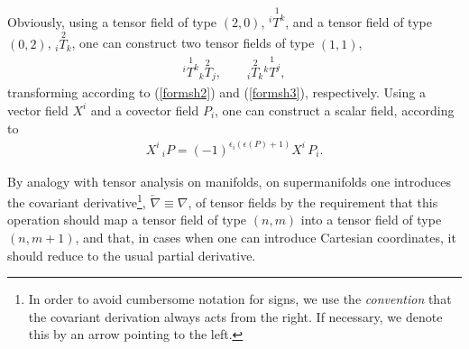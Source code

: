 \documentclass[a4paper,11pt]{article}
\begin{document}
Obviously, using a tensor field of type $(2,0)$,
${\stackrel{1}{^{i}T^{k}}}$, and a tensor field of type $(0,2)$,
${\stackrel{2}{_{i}T_{k}}}$, one can construct two tensor fields
of type $(1,1)$,
\begin{eqnarray} \label{contr}
{\overset{1}{^iT^k}}{\overset{2}{_kT_j}},\qquad
{\overset{2}{_iT_k}}{\overset{1}{^kT^j}},
\end{eqnarray}
transforming according to (\ref{formsh2}) and (\ref{formsh3}), respectively.
Using a vector field $X^{i}$ and a covector field $P_{i}$, one can construct
a scalar field, according to
\begin{eqnarray}
\label{sc} X^i\,_iP = (-1)^{\epsilon_i(\epsilon(P)+1)}X^i\,P_i.
\end{eqnarray}

By analogy with tensor analysis on manifolds, on supermanifolds one
introduces the covariant derivative\footnote{%
In order to avoid cumbersome notation for signs, we use the \emph{convention}
that the covariant derivation always acts from the right. If necessary, we
denote this by an arrow pointing to the left.}, $\overleftarrow{\nabla }%
\equiv \nabla $, of tensor fields by the requirement that this
operation
should map a tensor field of type $(n,m)$ into a tensor field of type $%
(n,m+1)$, and that, in cases when one can introduce Cartesian
coordinates, it should reduce to the usual partial derivative.
\end{document}
